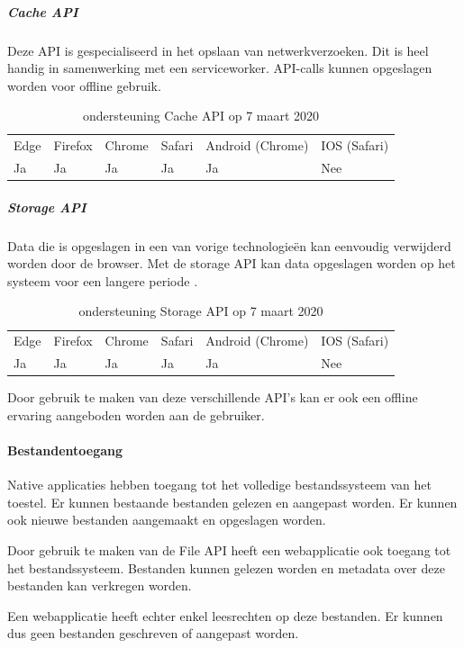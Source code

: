 	
	\subparagraph{Cache API}
	Deze API is gespecialiseerd in het opslaan van netwerkverzoeken. Dit is heel handig in samenwerking met een serviceworker. API-calls kunnen opgeslagen worden voor offline gebruik.
	\autocite{vanKesteren2008}
	
	\begin{table}[H]
		\centering
			\begin{tabular}{llllll}
				Edge & Firefox & Chrome & Safari & Android (Chrome) & IOS (Safari) \\
				Ja   & Ja      &  Ja     & Ja     & Ja               & Nee          
			\end{tabular}	
			\caption{ondersteuning Cache API op 7 maart 2020}
	\end{table}
	
	
	\subparagraph{Storage API}
	Data die is opgeslagen in een van vorige technologieën kan eenvoudig verwijderd worden door de browser. Met de storage API kan data opgeslagen worden op het systeem voor een langere periode .
	\autocite{Mozilla2020b}
	
	\begin{table}[H]
		\centering
		\begin{tabular}{llllll}
			Edge & Firefox & Chrome & Safari & Android (Chrome) & IOS (Safari) \\
			Ja   & Ja      &  Ja     & Ja     & Ja               & Nee          
		\end{tabular}	
		\caption{ondersteuning Storage API op 7 maart 2020}
	\end{table}
	
	
	
Door gebruik te maken van deze verschillende API’s kan er ook een offline ervaring aangeboden worden aan de gebruiker. 
	
\paragraph{Bestandentoegang}

Native applicaties hebben toegang tot het volledige bestandssysteem van het toestel. Er kunnen bestaande bestanden gelezen en aangepast worden. Er kunnen ook nieuwe bestanden aangemaakt en opgeslagen worden.

Door gebruik te maken van de File API \autocite{Kruisselbrink2019} heeft een webapplicatie ook toegang tot het bestandssysteem. Bestanden kunnen gelezen worden en metadata over deze bestanden kan verkregen worden.

Een webapplicatie heeft echter enkel leesrechten op deze bestanden. Er kunnen dus geen bestanden geschreven of aangepast worden.

